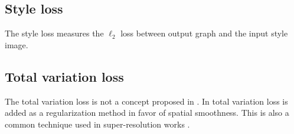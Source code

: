\subsection{Style loss}
The style loss measures the $\ell_2$ loss between output graph and the input style image.


\subsection{Total variation loss}
The total variation loss is not a concept proposed in \cite{Gatys:2016gj}.
In \cite{Johnson:2016hp} total variation loss is added as a regularization method
in favor of spatial smoothness.
This is also a common technique used in super-resolution works \cite{aly2005image, zhang2010non}.
